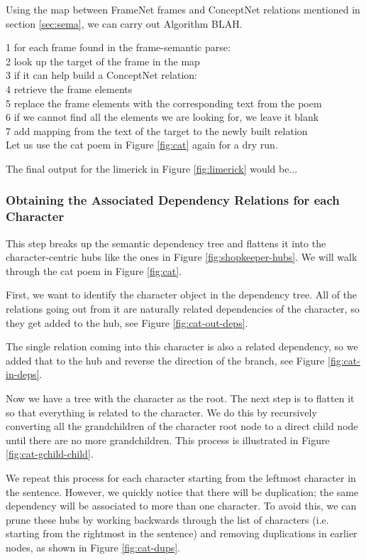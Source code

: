 Using the map between FrameNet frames and ConceptNet relations mentioned in section \ref{sec:sema}, we can carry out Algorithm BLAH.

1 for each frame found in the frame-semantic parse:\\
2	look up the target of the frame in the map\\
3	if it can help build a ConceptNet relation:	\\
4		retrieve the frame elements\\
5		replace the frame elements with the corresponding text from the poem\\
6			if we cannot find all the elements we are looking for, we leave it blank\\
7		add mapping from the text of the target to the newly built relation\\
	
Let us use the cat poem in Figure \ref{fig:cat} again for a dry run.

The final output for the limerick in Figure \ref{fig:limerick} would be...

\subsubsection{Obtaining the Associated Dependency Relations for each Character}

This step breaks up the semantic dependency tree and flattens it into the character-centric hubs like the ones in Figure \ref{fig:shopkeeper-hubs}. We will walk through the cat poem in Figure \ref{fig:cat}.

First, we want to identify the character object in the dependency tree. All of the relations going out from it are naturally related dependencies of the character, so they get added to the hub, see Figure \ref{fig:cat-out-deps}.

The single relation coming into this character is also a related dependency, so we added that to the hub and reverse the direction of the branch, see Figure \ref{fig:cat-in-deps}.

Now we have a tree with the character as the root. The next step is to flatten it so that everything is related to the character. We do this by recursively converting all the grandchildren of the character root node to a direct child node until there are no more grandchildren. This process is illustrated in Figure \ref{fig:cat-gchild-child}.

We repeat this process for each character starting from the leftmost character in the sentence. However, we quickly notice that there will be duplication; the same dependency will be associated to more than one character. To avoid this, we can prune these hubs by working backwards through the list of characters (i.e. starting from the rightmost in the sentence) and removing duplications in earlier nodes, as shown in Figure \ref{fig:cat-dups}. 

